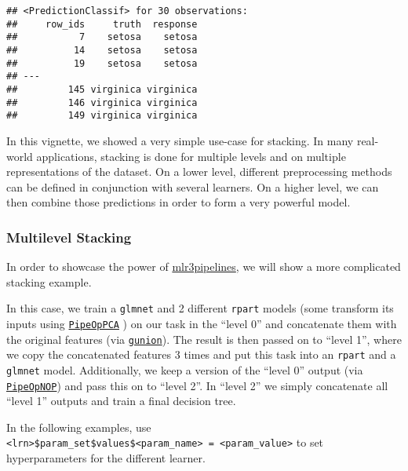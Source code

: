 \documentclass[
]{scrbook}
\begin{document}
\begin{verbatim}
## <PredictionClassif> for 30 observations:
##     row_ids     truth  response
##           7    setosa    setosa
##          14    setosa    setosa
##          19    setosa    setosa
## ---                            
##         145 virginica virginica
##         146 virginica virginica
##         149 virginica virginica
\end{verbatim}

In this vignette, we showed a very simple use-case for stacking.
In many real-world applications, stacking is done for multiple levels and on multiple representations of the dataset.
On a lower level, different preprocessing methods can be defined in conjunction with several learners.
On a higher level, we can then combine those predictions in order to form a very powerful model.

\hypertarget{multilevel-stacking}{%
\subsubsection{Multilevel Stacking}\label{multilevel-stacking}}

In order to showcase the power of \href{https://mlr3pipelines.mlr-org.com}{mlr3pipelines}, we will show a more complicated stacking example.

In this case, we train a \texttt{glmnet} and 2 different \texttt{rpart} models (some transform its inputs using \href{https://mlr3pipelines.mlr-org.com/reference/mlr_pipeops_pca.html}{\texttt{PipeOpPCA}} ) on our task in the ``level 0'' and concatenate them with the original features (via \href{https://mlr3pipelines.mlr-org.com/reference/gunion.html}{\texttt{gunion}}).
The result is then passed on to ``level 1'', where we copy the concatenated features 3 times and put this task into an \texttt{rpart} and a \texttt{glmnet} model.
Additionally, we keep a version of the ``level 0'' output (via \href{https://mlr3pipelines.mlr-org.com/reference/mlr_pipeops_nop.html}{\texttt{PipeOpNOP}}) and pass this on to ``level 2''.
In ``level 2'' we simply concatenate all ``level 1'' outputs and train a final decision tree.

In the following examples, use \texttt{\textless{}lrn\textgreater{}\$param\_set\$values\$\textless{}param\_name\textgreater{}\ =\ \textless{}param\_value\textgreater{}} to set hyperparameters
for the different learner.
\end{document}
